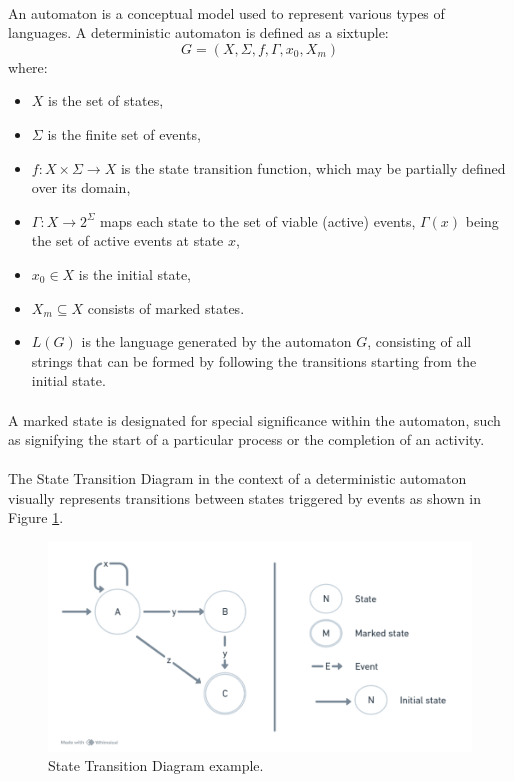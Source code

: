\paragraph{} An automaton is a conceptual model used to represent various types of languages. A deterministic automaton is defined as a sixtuple:
$$
G=\left(X, \Sigma, f, \Gamma, x_0, X_m\right)
$$
where:
\begin{itemize}
  \item \(X\) is the set of states,
  \item \(\Sigma\) is the finite set of events,
  \item \(f: X \times \Sigma \rightarrow X\) is the state transition function, which may be partially defined over its domain,
  \item \(\Gamma: X \rightarrow 2^{\Sigma}\) maps each state to the set of viable (active) events, \(\Gamma(x)\) being the set of active events at state \(x\),
  \item \(x_0 \in X\) is the initial state,
  \item \(X_m \subseteq X\) consists of marked states.
  \item \(L(G)\) is the language generated by the automaton \(G\), consisting of all strings that can be formed by following the transitions starting from the initial state.
\end{itemize}

\paragraph{} A marked state is designated for special significance within the automaton, such as signifying the start of a particular process or the completion of an activity.


\paragraph{} The State Transition Diagram in the context of a deterministic automaton visually represents transitions between states triggered by events as shown in Figure \ref{fig:state_transition_diagram_example}.

\begin{figure} [H]
    \centering
    \includegraphics[width=0.7\linewidth]{figuras/automaton.png}
    \caption{State Transition Diagram example.}
    \label{fig:state_transition_diagram_example}
\end{figure}

